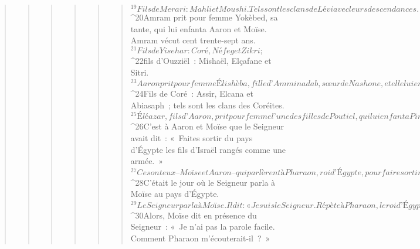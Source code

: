 \begin{verse}
\begin{verse}
\begin{verse}
\begin{verse}
\begin{verse}
\begin{verse}
${}^{19}Fils de Merari : Mahli et Moushi. Tels sont les clans de Lévi avec leurs descendances.
${}^{20}Amram prit pour femme Yokèbed, sa tante, qui lui enfanta Aaron et Moïse. Amram vécut cent trente-sept ans.
${}^{21}Fils de Yisehar : Coré, Néfeg et Zikri ; 
${}^{22}fils d’Ouzziël : Mishaël, Elçafane et Sitri.
${}^{23}Aaron prit pour femme Élishèba, fille d’Amminadab, sœur de Nashone, et elle lui enfanta Nadab, Abihou, Éléazar et Itamar.
${}^{24}Fils de Coré : Assir, Elcana et Abiasaph ; tels sont les clans des Coréites.
${}^{25}Éléazar, fils d’Aaron, prit pour femme l’une des filles de Poutiel, qui lui enfanta Pinhas. Tels sont les chefs de famille des Lévites, par clans.
${}^{26}C’est à Aaron et Moïse que le Seigneur avait dit : « Faites sortir du pays d’Égypte les fils d’Israël rangés comme une armée. » 
${}^{27}Ce sont eux – Moïse et Aaron – qui parlèrent à Pharaon, roi d’Égypte, pour faire sortir d’Égypte les fils d’Israël.
${}^{28}C’était le jour où le Seigneur parla à Moïse au pays d’Égypte. 
${}^{29}Le Seigneur parla à Moïse. Il dit : « Je suis le Seigneur. Répète à Pharaon, le roi d’Égypte, tout ce que moi, je vais te dire. » 
${}^{30}Alors, Moïse dit en présence du Seigneur : « Je n’ai pas la parole facile. Comment Pharaon m’écouterait-il ? »
      

\end{verse}
\end{verse}
\end{verse}
\end{verse}
\end{verse}
\end{verse}
